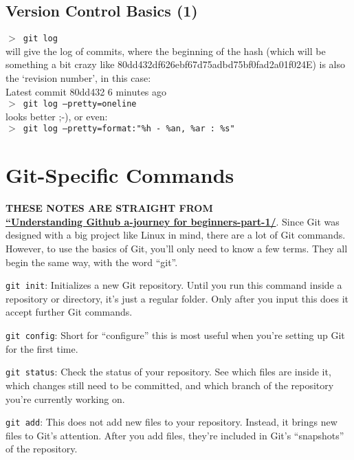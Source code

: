 \documentclass[11pt,a4paper]{article}
\begin{document}
   \subsection{Version Control Basics (1)}
   {\tt  $>$ git log}\\
   will give the log of commits, where the beginning of the hash
   (which will be something a bit crazy like 80dd432df626ebf67d75adbd75bf0fad2a01f024E)
   is also the `revision number', in this case: \\
   Latest commit 80dd432 6 minutes ago \\

   \noindent
   {\tt $>$ git log --pretty=oneline}\\ 
   looks better ;-), or even: \\

   \noindent
   {\tt $>$ git log --pretty=format:"\%h - \%an, \%ar : \%s"} \\


\newpage
\section{Git-Specific Commands}
{\bf THESE NOTES ARE STRAIGHT FROM\\
\href{http://readwrite.com/2013/09/30/understanding-github-a-journey-for-beginners-part-1/}{``Understanding Github a-journey for beginners-part-1/}}.
Since Git was designed with a big project like Linux in mind, there
are a lot of Git commands. However, to use the basics of Git, you’ll
only need to know a few terms. They all begin the same way, with the
word ``git''.

\weeskip
{\tt git init}: Initializes a new Git repository. Until you run this
command inside a repository or directory, it’s just a regular
folder. Only after you input this does it accept further Git commands.

\weeskip
{\tt git config}: Short for ``configure'' this is most useful when
you’re setting up Git for the first time.

\weeskip
{\tt git status}: Check the status of your repository. See which files
are inside it, which changes still need to be committed, and which
branch of the repository you’re currently working on.

\weeskip
{\tt git add}: This does not add new files to your
repository. Instead, it brings new files to Git’s attention. After you
add files, they’re included in Git's ``snapshots'' of the repository.
\end{document}
